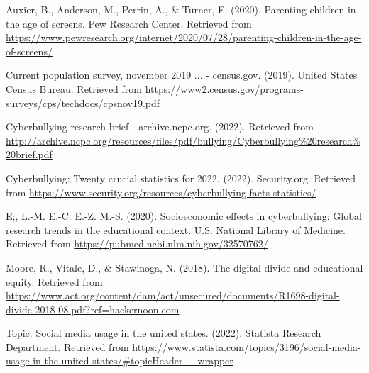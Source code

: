 \documentclass[
  man,LLO-8200, Introduction to Data Science]{apa6}
\newlength{\cslhangindent}
\newlength{\cslentryspacingunit} %
\newenvironment{CSLReferences}[2] %
 {%
  \setlength{\parindent}{0pt}
  \ifodd #1
  \let\oldpar\par
  \def\par{\hangindent=\cslhangindent\oldpar}
  \fi
  \setlength{\parskip}{#2\cslentryspacingunit}
 }%
 {}
\begin{document}
\hypertarget{refs}{}
\begin{CSLReferences}{1}{0}
\leavevmode{}%
Auxier, B., Anderson, M., Perrin, A., \& Turner, E. (2020). Parenting children in the age of screens. Pew Research Center. Retrieved from \url{https://www.pewresearch.org/internet/2020/07/28/parenting-children-in-the-age-of-screens/}

\leavevmode{}%
Current population survey, november 2019 ... - census.gov. (2019). United States Census Bureau. Retrieved from \url{https://www2.census.gov/programs-surveys/cps/techdocs/cpsnov19.pdf}

\leavevmode{}%
Cyberbullying research brief - archive.ncpc.org. (2022). Retrieved from \url{http://archive.ncpc.org/resources/files/pdf/bullying/Cyberbullying\%20research\%20brief.pdf}

\leavevmode{}%
Cyberbullying: Twenty crucial statistics for 2022. (2022). Security.org. Retrieved from \url{https://www.security.org/resources/cyberbullying-facts-statistics/}

\leavevmode{}%
E;, L.-M. E.-C. E.-Z. M.-S. (2020). Socioeconomic effects in cyberbullying: Global research trends in the educational context. U.S. National Library of Medicine. Retrieved from \url{https://pubmed.ncbi.nlm.nih.gov/32570762/}

\leavevmode{}%
Moore, R., Vitale, D., \& Stawinoga, N. (2018). The digital divide and educational equity. Retrieved from \url{https://www.act.org/content/dam/act/unsecured/documents/R1698-digital-divide-2018-08.pdf?ref=hackernoon.com}

\leavevmode{}%
Topic: Social media usage in the united states. (2022). Statista Research Department. Retrieved from \url{https://www.statista.com/topics/3196/social-media-usage-in-the-united-states/\#topicHeader__wrapper}

\end{CSLReferences}
\end{document}
